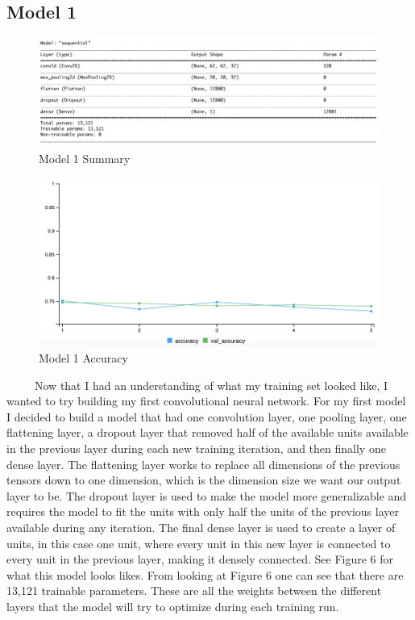 \documentclass[12pt]{article}
\begin{document}
\hypertarget{model-1}{%
\subsection{Model 1}\label{model-1}}

\begin{figure}

{\centering \includegraphics[width=0.75\linewidth,height=0.25\textheight]{images/model1} 

}

\caption{Model 1 Summary}\label{fig:sample-fig6}
\end{figure}

\begin{figure}

{\centering \includegraphics[width=0.75\linewidth,height=0.25\textheight]{images/model1out} 

}

\caption{Model 1 Accuracy}\label{fig:sample-fig7}
\end{figure}

~~~~~Now that I had an understanding of what my training set looked
like, I wanted to try building my first convolutional neural network.
For my first model I decided to build a model that had one convolution
layer, one pooling layer, one flattening layer, a dropout layer that
removed half of the available units available in the previous layer
during each new training iteration, and then finally one dense layer.
The flattening layer works to replace all dimensions of the previous
tensors down to one dimension, which is the dimension size we want our
output layer to be. The dropout layer is used to make the model more
generalizable and requires the model to fit the units with only half the
units of the previous layer available during any iteration. The final
dense layer is used to create a layer of units, in this case one unit,
where every unit in this new layer is connected to every unit in the
previous layer, making it densely connected. See Figure 6 for what this
model looks likes. From looking at Figure 6 one can see that there are
13,121 trainable parameters. These are all the weights between the
different layers that the model will try to optimize during each
training run.
\end{document}
